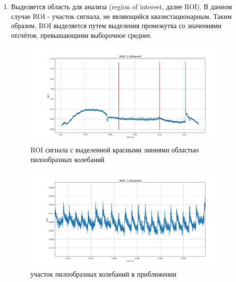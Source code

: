 \documentclass[12pt,a4paper]{article}
\begin{document}
			\begin{enumerate}
				\item Выделяется область для анализа (region of interest, далее ROI). В данном случае ROI - участок сигнала, не являющийся квазистационарным. Таким образом, ROI выделяется путем выделения промежутка со значениями отсчётов, превышающими выборочное среднее.
				\FloatBarrier
				\begin{figure}[h!]
					\centering\includegraphics[width=1\linewidth]{./../plots/signal_roi.png}
					\caption{ROI сигнала с выделенной красными линиями областью пилообразных колебаний}
				\end{figure}
				\FloatBarrier
				\FloatBarrier
				\begin{figure}[h!]
					\centering\includegraphics[width=1\linewidth]{./../plots/signal_roi_zoomed.png}
					\caption{участок пилообразных колебаний в приближении}
				\end{figure}
				\FloatBarrier
				

\end{enumerate}
\end{document}
